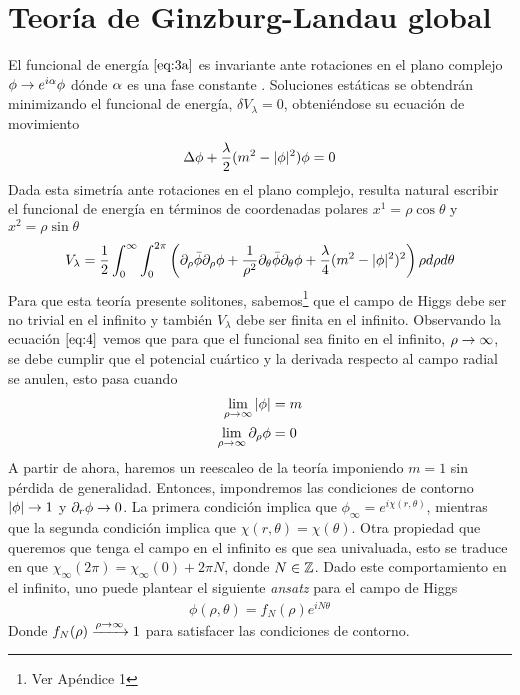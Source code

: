 \section{Teoría de Ginzburg-Landau global}

El funcional de energía $\eqref{eq:3a}$ es invariante ante rotaciones en el plano complejo $\phi\rightarrow e^{i\alpha}\phi$ dónde $\alpha$ es una fase constante . Soluciones estáticas se obtendrán minimizando el funcional de energía, $\delta V_\lambda=0$, obteniéndose su ecuación de movimiento
\begin{align}
    \Delta\phi+\frac{\lambda}{2}(m^2-|\phi|^2)\phi=0 \label{eq:3}
\end{align}
Dada esta simetría ante rotaciones en el plano complejo, resulta natural escribir el funcional de energía en términos de coordenadas polares $x^1=\rho\cos\theta$ y $x^2=\rho\sin\theta$
\begin{align}
    V_\lambda = \frac{1}{2}\int_0^\infty\int_0^{2\pi}\left(\partial_\rho\bar\phi\partial_\rho\phi+\frac{1}{\rho^2}\partial_\theta\bar\phi\partial_\theta\phi+\frac{\lambda}{4}(m^2-|\phi|^2)^2\right)\rho d\rho d\theta \label{eq:4}
\end{align}
Para que esta teoría presente solitones, sabemos\footnote{Ver Apéndice 1} que el campo de Higgs debe ser no trivial en el infinito y también $V_\lambda$ debe ser finita en el infinito. Observando la ecuación $\eqref{eq:4}$ vemos que para que el funcional sea finito en el infinito, $\rho\rightarrow\infty$, se debe cumplir que el potencial cuártico y la derivada respecto al campo radial se anulen, esto pasa cuando
\begin{align}
    \lim_{\rho\rightarrow\infty} |\phi| &= m \label{eq:5}\\
    \lim_{\rho\rightarrow\infty} \partial_\rho\phi &= 0 \label{eq:6}
\end{align}
A partir de ahora, haremos un reescaleo de la teoría imponiendo $m=1$ sin pérdida de generalidad. Entonces, impondremos las condiciones de contorno $|\phi|\rightarrow 1$ y $\partial_r\phi\rightarrow 0$. La primera condición implica que $\phi_\infty = e^{i\chi(r,\theta)}$, mientras que la segunda condición implica que $\chi(r,\theta)=\chi(\theta)$. Otra propiedad que queremos que tenga el campo en el infinito es que sea univaluada, esto se traduce en que $\chi_\infty(2\pi)=\chi_\infty(0)+2\pi N$, donde $N\in\mathbb{Z}$. Dado este comportamiento en el infinito, uno puede plantear el siguiente \emph{ansatz} para el campo de Higgs
\begin{align}
    \phi(\rho,\theta) = f_N(\rho)e^{iN\theta} \label{eq:7}
\end{align}
Donde $f_N(\rho)\xrightarrow{\rho\rightarrow\infty} 1$ para satisfacer las condiciones de contorno.

